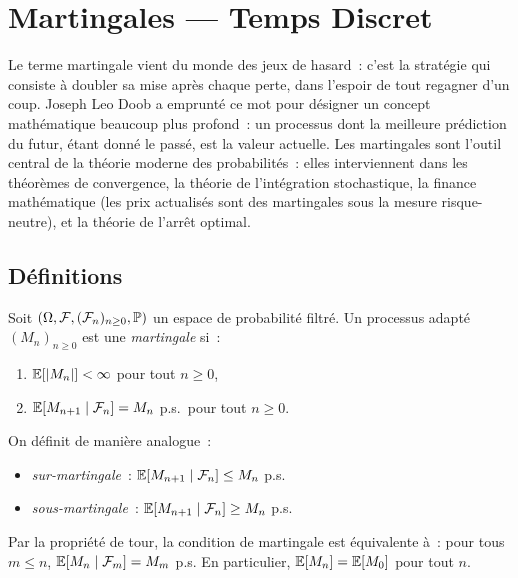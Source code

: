 \chapter{Martingales --- Temps Discret}
\label{ch:martingales_discret}

Le terme \og martingale \fg vient du monde des jeux de hasard~: c'est la strat\'egie qui consiste \`a doubler sa mise apr\`es chaque perte, dans l'espoir de tout regagner d'un coup. Joseph Leo Doob a emprunt\'e ce mot pour d\'esigner un concept math\'ematique beaucoup plus profond~: un processus dont la meilleure pr\'ediction du futur, \'etant donn\'e le pass\'e, est la valeur actuelle. Les martingales sont l'outil central de la th\'eorie moderne des probabilit\'es~: elles interviennent dans les th\'eor\`emes de convergence, la th\'eorie de l'int\'egration stochastique, la finance math\'ematique (les prix actualis\'es sont des martingales sous la mesure risque-neutre), et la th\'eorie de l'arr\^et optimal.

\section{D\'efinitions}

\begin{definition}
Soit $(\Omega, \mathcal{F}, (\mathcal{F}_n)_{n \geq 0}, \mathbb{P})$ un espace de
probabilit\'e filtr\'e. Un processus adapt\'e $(M_n)_{n \geq 0}$ est une
\emph{martingale} si~:
\begin{enumerate}
  \item $\mathbb{E}[\left| M_n \right|] < \infty$ pour tout $n \geq 0$,
  \item $\mathbb{E}[M_{n+1} \mid \mathcal{F}_n] = M_n$ p.s.\ pour tout $n \geq 0$.
\end{enumerate}
On d\'efinit de mani\`ere analogue~:
\begin{itemize}
  \item \emph{sur-martingale}~: $\mathbb{E}[M_{n+1} \mid \mathcal{F}_n] \leq M_n$ p.s.
  \item \emph{sous-martingale}~: $\mathbb{E}[M_{n+1} \mid \mathcal{F}_n] \geq M_n$ p.s.
\end{itemize}
\end{definition}

\begin{remarque}
Par la propri\'et\'e de tour, la condition de martingale est \'equivalente \`a~:
pour tous $m \leq n$, $\mathbb{E}[M_n \mid \mathcal{F}_m] = M_m$ p.s.
En particulier, $\mathbb{E}[M_n] = \mathbb{E}[M_0]$ pour tout $n$.
\end{remarque}

